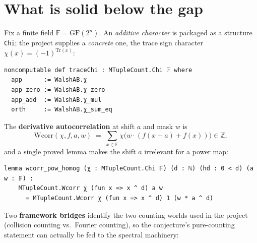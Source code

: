 \documentclass[11pt]{article}
\begin{document}

\bigskip

\section{What is solid below the gap}

\noindent
Fix a finite field $\mathbb{F}=\mathrm{GF}(2^n)$.  An \emph{additive character}
is packaged as a structure \texttt{Chi}; the project supplies a \emph{concrete}
one, the trace sign character $\chi(x)=(-1)^{\mathrm{Tr}(x)}$:

\begin{lstlisting}
noncomputable def traceChi : MTupleCount.Chi 𝔽 where
  app      := WalshAB.χ
  app_zero := WalshAB.χ_zero
  app_add  := WalshAB.χ_mul
  orth     := WalshAB.χ_sum_eq
\end{lstlisting}


\medskip

\noindent
The \textbf{derivative autocorrelation} at shift $a$ and mask $w$ is
\[
  \mathrm{Wcorr}(\chi, f, a, w)
  \;=\;
  \sum_{x\in\mathbb{F}} \chi\!\bigl(w\cdot(f(x+a)+f(x))\bigr)\in\mathbb{Z},
\]
and a single proved lemma makes the shift $a$ irrelevant for a power map:

\begin{lstlisting}
lemma wcorr_pow_homog (χ : MTupleCount.Chi 𝔽) (d : ℕ) (hd : 0 < d) (a w : 𝔽) :
    MTupleCount.Wcorr χ (fun x => x ^ d) a w
      = MTupleCount.Wcorr χ (fun x => x ^ d) 1 (w * a ^ d)
\end{lstlisting}


\medskip

\noindent
Two \textbf{framework bridges} identify the two counting worlds used in the
project (collision counting vs.\ Fourier counting), so the conjecture's
pure-counting statement can actually be fed to the spectral machinery:
\end{document}
